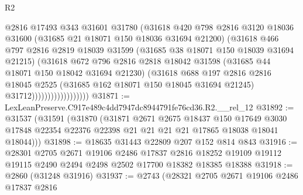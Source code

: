 \begin{lexlean}{R2}
\begin{coremodule}
                                @2816
                                @17493
                                @343
                                @31601
                                @31780
                                (@31618
                                  @420
                                  @798
                                  @2816
                                  @3120
                                  @18036
                                  @31600
                                  (@31685 @21 @18071 @150 @18036 @31694 @21200)
                                  (@31618
                                    @466
                                    @797
                                    @2816
                                    @2819
                                    @18039
                                    @31599
                                    (@31685 @38 @18071 @150 @18039 @31694 @21215)
                                    (@31618
                                      @672
                                      @796
                                      @2816
                                      @2818
                                      @18042
                                      @31598
                                      (@31685 @44 @18071 @150 @18042 @31694 @21230)
                                      (@31618
                                        @688
                                        @197
                                        @2816
                                        @2816
                                        @18045
                                        @2525
                                        (@31685 @162 @18071 @150 @18045 @31694 @21245)
                                        @31712))))))))))))))))))
@31871 := LexLeanPreserve.C917e489c4dd7947dc8944791fe76cd36.R2.__rel_12
@31892 := @31537
    (@31591
      (@31870
        (@31871
          @2671
          @2675
          @18437
          @150
          @17649
          @3030
          @17848
          @22354
          @22376
          @22398
          @21
          @21
          @21
          @21
          @17865
          @18038
          @18041
          @18044)))
@31898 := @18635 @31443 @22809 @207 @152 @814 @843
@31916 := @28301
    @2705
    @2671
    @19106
    @2486
    @17837
    @2816
    @18252
    @19109
    @19112
    @19115
    @2490
    @2494
    @2498
    @2502
    @17700
    @18382
    @18385
    @18388
@31918 := @2860 (@31248 @31916)
@31937 := @2743
    (@28321
      @2705
      @2671
      @19106
      @2486
      @17837
      @2816

\end{coremodule}
\end{lexlean}
